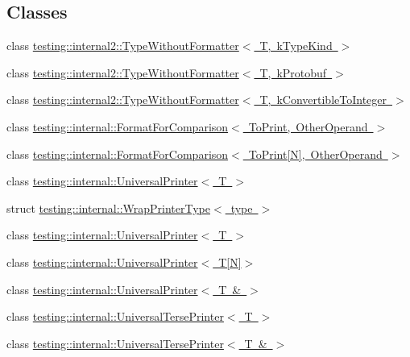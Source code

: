 \subsection*{Classes}
\begin{DoxyCompactItemize}
\item 
class \mbox{\hyperlink{classtesting_1_1internal2_1_1TypeWithoutFormatter}{testing\+::internal2\+::\+Type\+Without\+Formatter$<$ T, k\+Type\+Kind $>$}}
\item 
class \mbox{\hyperlink{classtesting_1_1internal2_1_1TypeWithoutFormatter_3_01T_00_01kProtobuf_01_4}{testing\+::internal2\+::\+Type\+Without\+Formatter$<$ T, k\+Protobuf $>$}}
\item 
class \mbox{\hyperlink{classtesting_1_1internal2_1_1TypeWithoutFormatter_3_01T_00_01kConvertibleToInteger_01_4}{testing\+::internal2\+::\+Type\+Without\+Formatter$<$ T, k\+Convertible\+To\+Integer $>$}}
\item 
class \mbox{\hyperlink{classtesting_1_1internal_1_1FormatForComparison}{testing\+::internal\+::\+Format\+For\+Comparison$<$ To\+Print, Other\+Operand $>$}}
\item 
class \mbox{\hyperlink{classtesting_1_1internal_1_1FormatForComparison_3_01ToPrint[N]_00_01OtherOperand_01_4}{testing\+::internal\+::\+Format\+For\+Comparison$<$ To\+Print\mbox{[}\+N\mbox{]}, Other\+Operand $>$}}
\item 
class \mbox{\hyperlink{classtesting_1_1internal_1_1UniversalPrinter}{testing\+::internal\+::\+Universal\+Printer$<$ T $>$}}
\item 
struct \mbox{\hyperlink{structtesting_1_1internal_1_1WrapPrinterType}{testing\+::internal\+::\+Wrap\+Printer\+Type$<$ type $>$}}
\item 
class \mbox{\hyperlink{classtesting_1_1internal_1_1UniversalPrinter}{testing\+::internal\+::\+Universal\+Printer$<$ T $>$}}
\item 
class \mbox{\hyperlink{classtesting_1_1internal_1_1UniversalPrinter_3_01T[N]_4}{testing\+::internal\+::\+Universal\+Printer$<$ T\mbox{[}\+N\mbox{]}$>$}}
\item 
class \mbox{\hyperlink{classtesting_1_1internal_1_1UniversalPrinter_3_01T_01_6_01_4}{testing\+::internal\+::\+Universal\+Printer$<$ T \& $>$}}
\item 
class \mbox{\hyperlink{classtesting_1_1internal_1_1UniversalTersePrinter}{testing\+::internal\+::\+Universal\+Terse\+Printer$<$ T $>$}}
\item 
class \mbox{\hyperlink{classtesting_1_1internal_1_1UniversalTersePrinter_3_01T_01_6_01_4}{testing\+::internal\+::\+Universal\+Terse\+Printer$<$ T \& $>$}}

\end{DoxyCompactItemize}
